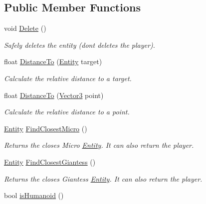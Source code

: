 \subsection*{Public Member Functions}
\begin{DoxyCompactItemize}
\item 
void \mbox{\hyperlink{class_lua_1_1_entity_a422af2c756caecc01bad49a14ba5da7f}{Delete}} ()
\begin{DoxyCompactList}\small\item\em Safely deletes the entity (don\textquotesingle{}t deletes the player). \end{DoxyCompactList}\item 
float \mbox{\hyperlink{class_lua_1_1_entity_a4ec9fe7962ad6a301c33253c735aedae}{Distance\+To}} (\mbox{\hyperlink{class_lua_1_1_entity}{Entity}} target)
\begin{DoxyCompactList}\small\item\em Calculate the relative distance to a target. \end{DoxyCompactList}\item 
float \mbox{\hyperlink{class_lua_1_1_entity_ad341a3f8e110857d06111b8b6f29d646}{Distance\+To}} (\mbox{\hyperlink{class_lua_1_1_vector3}{Vector3}} point)
\begin{DoxyCompactList}\small\item\em Calculate the relative distance to a point. \end{DoxyCompactList}\item 
\mbox{\hyperlink{class_lua_1_1_entity}{Entity}} \mbox{\hyperlink{class_lua_1_1_entity_a2e06bf904c49f705ac361e1538365e2e}{Find\+Closest\+Micro}} ()
\begin{DoxyCompactList}\small\item\em Returns the closes Micro \mbox{\hyperlink{class_lua_1_1_entity}{Entity}}. It can also return the player. \end{DoxyCompactList}\item 
\mbox{\hyperlink{class_lua_1_1_entity}{Entity}} \mbox{\hyperlink{class_lua_1_1_entity_ac7eac4ebcb1fe784ab5c06eed7885cf7}{Find\+Closest\+Giantess}} ()
\begin{DoxyCompactList}\small\item\em Returns the closes Giantess \mbox{\hyperlink{class_lua_1_1_entity}{Entity}}. It can also return the player. \end{DoxyCompactList}\item 
bool \mbox{\hyperlink{class_lua_1_1_entity_a27a8d5461e9d6890e085b06e2d00f6bd}{is\+Humanoid}} ()

\end{DoxyCompactItemize}
